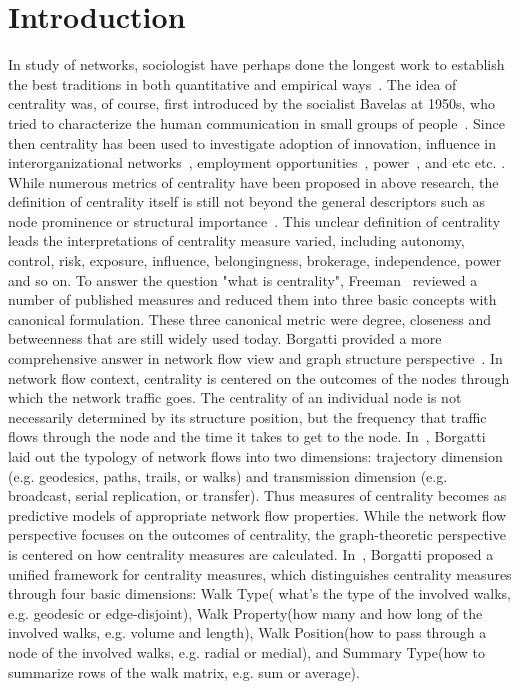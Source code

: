\documentclass[symmetry,article,submit,moreauthors,pdftex,10pt,a4paper]{Definitions/mdpi}
\makeatletter
\newcommand*{\eg}{e.g.\@\xspace}
\newcommand*{\etc}{%
    \@ifnextchar{.}%
        {etc}%
        {etc.\@\xspace}%
}
\makeatother
\begin{document}

\section{Introduction}
\label{sec:introduction}
In  study of networks, sociologist have perhaps done the longest work to establish the best traditions in both quantitative and empirical ways~\cite{newman2010networks}. The idea of centrality was, of course, first introduced by the socialist Bavelas at 1950s, who tried to characterize the human communication in small groups of people~\cite{latora2007measure}. Since then centrality has been used to investigate  adoption of innovation\cite{coleman1966medical}, influence in interorganizational networks~\cite{laumann1973new}, employment opportunities~\cite{granovetter1995getting},  power~\cite{burt1982toward}, and \etc. While numerous metrics of centrality have been proposed in above research, the definition of centrality itself is still not beyond the general descriptors such as node prominence or structural importance~\cite{borgatti2006graph}. This unclear definition of centrality leads the interpretations of centrality measure varied, including autonomy, control, risk, exposure, influence, belongingness, brokerage, independence, power and so on. To answer the question "what is centrality", Freeman~\cite{freeman1979centrality} reviewed a number of published measures and reduced them into three basic concepts with canonical formulation. These three canonical metric were degree, closeness and betweenness that are still widely used today. Borgatti provided a more comprehensive answer in network flow view\cite{borgatti2005centrality}  and graph structure perspective~\cite{borgatti2006graph}.  In network flow context, centrality is centered on the outcomes of the nodes through which the network traffic goes. The centrality of an individual node is not necessarily determined by its structure position, but the frequency that traffic flows through the node and the time it takes to get to the node. In~\cite{borgatti2005centrality}, Borgatti laid out the typology of network flows into two dimensions:  trajectory dimension (\eg geodesics, paths, trails, or
walks) and transmission dimension (\eg broadcast, serial replication, or transfer). Thus measures of centrality becomes as predictive models of appropriate network flow properties. While the network flow perspective focuses on the outcomes of centrality, the graph-theoretic perspective is centered on how centrality measures are calculated. In~\cite{borgatti2006graph}, Borgatti  proposed a unified framework for centrality measures, which distinguishes centrality measures through four basic dimensions: Walk Type( what's the type of the involved walks, \eg geodesic or edge-disjoint), Walk Property(how many and how long of the involved walks, \eg volume and length), Walk Position(how to pass through a node of the involved walks, \eg radial or medial), and Summary Type(how to summarize rows of the walk matrix, \eg sum or average).
\end{document}
